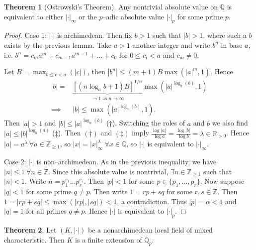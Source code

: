 \documentclass{article}
\theoremstyle{definition}
\newtheorem{theorem}{Theorem}[section]
\begin{document}
\begin{theorem}[Ostrowski's Theorem]
    Any nontrivial absolute value on $\mathbb{Q}$ is equivalent to either $|\cdot|_{\infty}$ or the $p$--adic absolute value $|\cdot|_{p}$ for some prime $p$.
\end{theorem}
\begin{proof}
    Case 1: $|\cdot|$ is archimedean. Then fix $b>1$ such that $|b|>1$, where such a $b$ exists by the previous lemma. Take $a>1$ another integer and write $b^n$ in base $a$, i.e. $b^n = c_ma^m + c_{m-1}a^{m-1} + \ldots + c_0$ for $0\le c_i<a$ and $c_m \neq 0$. 
    \vspace{1mm}
     
    Let $B = \max_{0\le c<a}(|c|)$, then $|b^n| \le (m+1)B \max(|a|^m,1)$. Hence 
    \begin{align*}
        |b| =& \underbrace{\left[(n \log_{a}b+1)B\right]^{1/n}}_{\to 1 \text{ as }n \to \infty}\max(|a|^{\log_a(b)},1) \\
        \implies & |b|\le \max(|a|^{\log_a(b)},1).
    \end{align*}
    Then $|a|>1$ and $|b|\le |a|^{\log_a(b)}$ ($\dagger$). Switching the roles of $a$ and $b$ we also find $|a|\le |b|^{\log_b(a)}$ ($\ddagger$). Then $(\dagger)$ and $(\ddagger)$ imply $\frac{\log|a|}{\log a} = \frac{\log |b|}{\log b} = \lambda \in \mathbb{R}_{> 0}$. Hence $|a| = a^{\lambda} ~\forall a \in \mathbb{Z}_{\ge 1}$, so $|x|=|x|_{\infty}^{\lambda}~\forall x \in \mathbb{Q}$, so $|\cdot|$ is equivalent to $|\cdot|_{\infty}$.
    \vspace{1mm}
     
    Case 2: $|\cdot|$ is non--archimedean. As in the previous inequality, we have $|n|\le 1 ~\forall n \in \mathbb{Z}$. Since this absolute value is nontrivial, $\exists n \in \mathbb{Z}_{\ge 1}$ such that $|n|<1$. Write $n = p_1^{e_1}\ldots p_r^{e_r}$. Then $|p|<1$ for some $p \in \{p_1,\ldots,p_r\}$. Now suppose $|q|<1$ for some prime $q \neq p$. Then write $1 = rp+sq$ for some $r,s \in \mathbb{Z}$. Then $1 = |rp+sq|\le \max(|rp|, |sq|) < 1$, a contradiction. Thus $|p| = \alpha<1$ and $|q| = 1$ for all primes $q \neq p$. Hence $|\cdot|$ is equivalent to $|\cdot|_p$.
\end{proof}
\begin{theorem}
    Let $(K,|\cdot|)$ be a nonarchimedean local field of mixed characteristic. Then $K$ is a finite extension of $\mathbb{Q}_p$.
\end{theorem}
\end{document}
